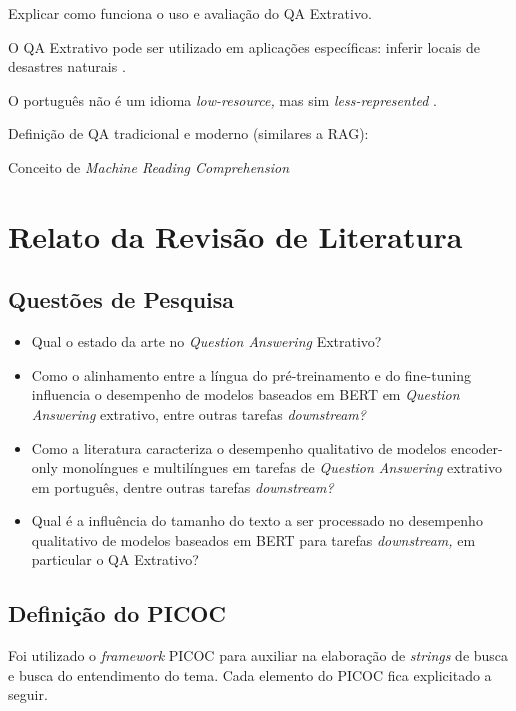 \documentclass[12pt,a4paper]{article}
\begin{document}
Explicar como funciona o uso e avaliação do QA Extrativo.

O QA Extrativo pode ser utilizado em aplicações específicas: inferir locais de desastres naturais \cite{sharma}.

O português não é um idioma \textit{low-resource,} mas sim \textit{less-represented} \cite{villegas}.

Definição de QA tradicional e moderno (similares a RAG): \cite{le}

Conceito de \textit{Machine Reading Comprehension} \cite{ning}

\section{Relato da Revisão de Literatura}

\subsection{Questões de Pesquisa}
\begin{itemize}
    \item Qual o estado da arte no \textit{Question Answering} Extrativo?
    \item Como o alinhamento entre a língua do pré-treinamento e do fine-tuning influencia o desempenho de modelos baseados em BERT em \textit{Question Answering} extrativo, entre outras tarefas \textit{downstream?}
    \item Como a literatura caracteriza o desempenho qualitativo de modelos encoder-only monolíngues e multilíngues em tarefas de \textit{Question Answering} extrativo em português, dentre outras tarefas \textit{downstream?}
    \item Qual é a influência do tamanho do texto a ser processado no desempenho qualitativo de modelos baseados em BERT para tarefas \textit{downstream,} em particular o QA Extrativo?
\end{itemize}

\subsection{Definição do PICOC}
Foi utilizado o \textit{framework} PICOC para auxiliar na elaboração de \textit{strings} de busca e busca do entendimento do tema. Cada elemento do PICOC fica explicitado a seguir.
\end{document}
